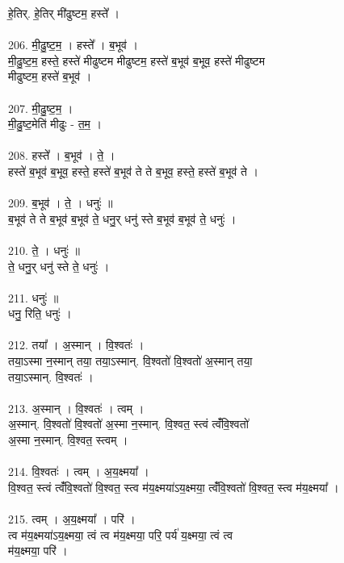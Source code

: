 हे॒तिर्. हे॒तिर् मी॑ढुष्टम॒ हस्ते᳚ ।\\
\\
206. मी॒ढु॒ष्ट॒म॒ । हस्ते᳚ । ब॒भूव॑ ।\\
मी॒ढु॒ष्ट॒म॒ हस्ते॒ हस्ते॑ मीढुष्टम मीढुष्टम॒ हस्ते॑ ब॒भूव॑ ब॒भूव॒ हस्ते॑ मीढुष्टम\\
मीढुष्टम॒ हस्ते॑ ब॒भूव॑ ।\\
\\
207. मी॒ढु॒ष्ट॒म॒ ।\\
मी॒ढु॒ष्ट॒मेति॑ मीढुः - त॒म॒ ।\\
\\
208. हस्ते᳚ । ब॒भूव॑ । ते॒ ।\\
हस्ते॑ ब॒भूव॑ ब॒भूव॒ हस्ते॒ हस्ते॑ ब॒भूव॑ ते ते ब॒भूव॒ हस्ते॒ हस्ते॑ ब॒भूव॑ ते ।\\
\\
209. ब॒भूव॑ । ते॒ । धनुः॑ ॥\\
ब॒भूव॑ ते ते ब॒भूव॑ ब॒भूव॑ ते॒ धनु॒र् धनु॑ स्ते ब॒भूव॑ ब॒भूव॑ ते॒ धनुः॑ ।\\
\\
210. ते॒ । धनुः॑ ॥\\
ते॒ धनु॒र् धनु॑ स्ते ते॒ धनुः॑ ।\\
\\
211. धनुः॑ ॥\\
धनु॒ रिति॒ धनुः॑ ।\\
\\
212. तया᳚ । अ॒स्मान् । वि॒श्वतः॑ ।\\
तया॒ऽस्मा न॒स्मान् तया॒ तया॒ऽस्मान्. वि॒श्वतो॑ वि॒श्वतो॑ अ॒स्मान् तया॒\\
तया॒ऽस्मान्. वि॒श्वतः॑ ।\\
\\
213. अ॒स्मान् । वि॒श्वतः॑ । त्वम् ।\\
अ॒स्मान्. वि॒श्वतो॑ वि॒श्वतो॑ अ॒स्मा न॒स्मान्. वि॒श्वत॒ स्त्वं त्वंँवि॒श्वतो॑\\
अ॒स्मा न॒स्मान्. वि॒श्वत॒ स्त्वम् ।\\
\\
214. वि॒श्वतः॑ । त्वम् । अ॒य॒क्ष्मया᳚ ।\\
वि॒श्वत॒ स्त्वं त्वंँवि॒श्वतो॑ वि॒श्वत॒ स्त्व म॑य॒क्ष्मया॑ऽय॒क्ष्मया॒ त्वंँवि॒श्वतो॑ वि॒श्वत॒ स्त्व म॑य॒क्ष्मया᳚ ।\\
\\
215. त्वम् । अ॒य॒क्ष्मया᳚ । परि॑ ।\\
त्व म॑य॒क्ष्मया॑ऽय॒क्ष्मया॒ त्वं त्व म॑य॒क्ष्मया॒ परि॒ पर्य॑ य॒क्ष्मया॒ त्वं त्व\\
म॑य॒क्ष्मया॒ परि॑ ।\\
\\
